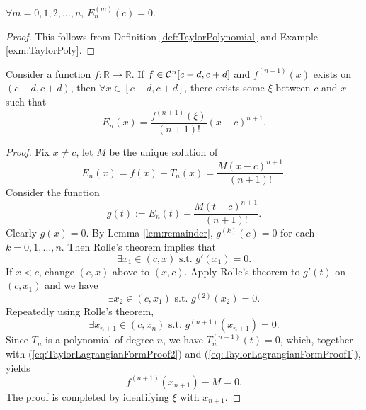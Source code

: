 \begin{lem}
  \label{lem:remainder}
  $\forall m=0,1,2,\ldots,n$, $E_n^{(m)}(c)=0$.
\end{lem}
\begin{proof}
  This follows from Definition \ref{def:TaylorPolynomial}
   and Example \ref{exm:TaylorPoly}.
\end{proof}

 \begin{thm}
   \label{thm:TaylorLagrangianForm}
   Consider a function
    $f: \mathbb{R} \rightarrow \mathbb{R}$.
   If $f\in {\cal C}^n[c-d,c+d]$
    and $f^{(n+1)}(x)$ exists on $(c-d, c+d)$,
   then
    $\forall x\in [c-d,c+d]$,
    there exists some $\xi$ between $c$ and $x$
    such that
    \begin{equation}
      \label{eq:TaylorTheorem}
      E_n(x) = \frac{f^{(n+1)}(\xi)}{(n+1)!}(x-c)^{n+1}.
    \end{equation}
 \end{thm}
 \begin{proof}
   Fix $x\ne c$,
    let $M$ be the unique solution of 
   \begin{equation*}
     E_n(x) = f(x) - T_n(x) = \frac{M(x-c)^{n+1}}{(n+1)!}.
   \end{equation*}
   Consider the function
   \begin{equation}
     \label{eq:TaylorLagrangianFormProof1}
     g(t) := E_n(t) - \frac{M(t-c)^{n+1}}{(n+1)!}.
   \end{equation}
   Clearly $g(x)=0$.
   By Lemma \ref{lem:remainder},
    $g^{(k)}(c)=0$ for each $k= 0,1,\ldots,n$.
   Then Rolle's theorem implies that
   \begin{equation*}
    \exists x_1\in (c, x) \text{ s.t. } g'(x_1)=0. 
   \end{equation*}
   If $x<c$, change $(c,x)$ above to $(x,c)$.
   Apply Rolle's theorem to $g'(t)$ on $(c,x_1)$
   and we have
   \begin{equation*}
    \exists x_2\in (c, x_1) \text{ s.t. } g^{(2)}(x_2)=0. 
   \end{equation*}
   Repeatedly using Rolle's theorem,
   \begin{equation}
     \label{eq:TaylorLagrangianFormProof2}
    \exists x_{n+1}\in (c, x_n) \text{ s.t. } g^{(n+1)}(x_{n+1})=0.
  \end{equation}
  Since $T_n$ is a polynomial of degree $n$,
   we have $T_n^{(n+1)}(t)=0$, 
   which, together with
   (\ref{eq:TaylorLagrangianFormProof2})
   and (\ref{eq:TaylorLagrangianFormProof1}),
   yields 
   \begin{equation*}
     f^{(n+1)}(x_{n+1})-M=0.
   \end{equation*}
   The proof is completed
    by identifying $\xi$ with $x_{n+1}$.
\end{proof}

